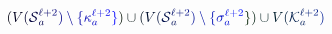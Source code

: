 \documentclass[12pt]{article}
\begin{document}
\makeatletter
\renewcommand*{\@textcolor}[3]{%
  \protect\leavevmode
  \begingroup
    \color#1{#2}#3%
  \endgroup
}
\makeatother
\begin{displaymath}
\mathcolor[RGB]{0,0,15}{(} \mathcolor[RGB]{0,0,30}{V} \mathcolor[RGB]{0,0,45}{(} \mathcal { \mathcolor[RGB]{0,0,60}{S} } _ { \mathcolor[RGB]{0,0,75}{a} } ^ { \mathcolor[RGB]{0,0,90}{\ell} \mathcolor[RGB]{0,0,105}{+} \mathcolor[RGB]{0,0,120}{2} } \mathcolor[RGB]{0,0,135}{)} \mathcolor[RGB]{0,0,150}{\setminus} \mathcolor[RGB]{0,0,165}{\{} \mathcolor[RGB]{0,0,180}{\kappa} _ { \mathcolor[RGB]{0,0,195}{a} } ^ { \mathcolor[RGB]{0,0,210}{\ell} \mathcolor[RGB]{0,0,225}{+} \mathcolor[RGB]{0,0,240}{2} } \mathcolor[RGB]{0,0,255}{\}} \mathcolor[RGB]{0,15,0}{)} \mathcolor[RGB]{0,15,15}{\cup} \mathcolor[RGB]{0,15,30}{(} \mathcolor[RGB]{0,15,45}{V} \mathcolor[RGB]{0,15,60}{(} \mathcal { \mathcolor[RGB]{0,15,75}{S} } _ { \mathcolor[RGB]{0,15,90}{a} } ^ { \mathcolor[RGB]{0,15,105}{\ell} \mathcolor[RGB]{0,15,120}{+} \mathcolor[RGB]{0,15,135}{2} } \mathcolor[RGB]{0,15,150}{)} \mathcolor[RGB]{0,15,165}{\setminus} \mathcolor[RGB]{0,15,180}{\{} \mathcolor[RGB]{0,15,195}{\sigma} _ { \mathcolor[RGB]{0,15,210}{a} } ^ { \mathcolor[RGB]{0,15,225}{\ell} \mathcolor[RGB]{0,15,240}{+} \mathcolor[RGB]{0,15,255}{2} } \mathcolor[RGB]{0,30,0}{\}} \mathcolor[RGB]{0,30,15}{)} \mathcolor[RGB]{0,30,30}{\cup} \mathcolor[RGB]{0,30,45}{V} \mathcolor[RGB]{0,30,60}{(} \mathcal { \mathcolor[RGB]{0,30,75}{K} } _ { \mathcolor[RGB]{0,30,90}{a} } ^ { \mathcolor[RGB]{0,30,105}{\ell} \mathcolor[RGB]{0,30,120}{+} \mathcolor[RGB]{0,30,135}{2} } \mathcolor[RGB]{0,30,150}{)}
\end{displaymath}
\end{document}
